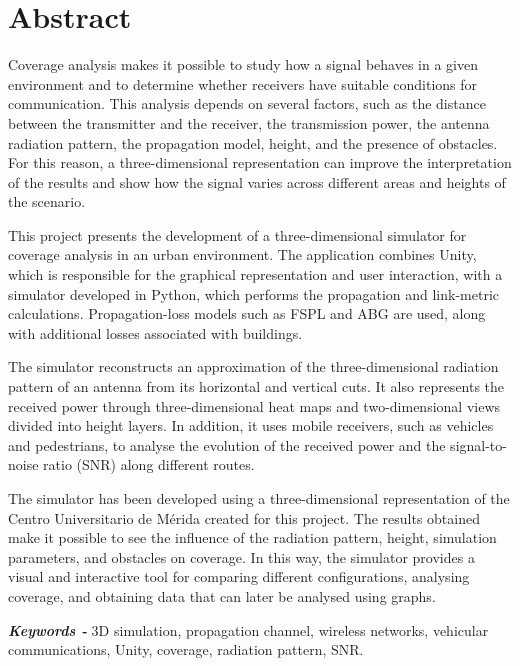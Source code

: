 \renewcommand{\keywords}{{\itshape \bfseries Keywords - }}
\chapter*{Abstract} 

Coverage analysis makes it possible to study how a signal behaves in a given environment and to determine whether receivers have suitable conditions for communication. This analysis depends on several factors, such as the distance between the transmitter and the receiver, the transmission power, the antenna radiation pattern, the propagation model, height, and the presence of obstacles. For this reason, a three-dimensional representation can improve the interpretation of the results and show how the signal varies across different areas and heights of the scenario.

This project presents the development of a three-dimensional simulator for coverage analysis in an urban environment. The application combines Unity, which is responsible for the graphical representation and user interaction, with a simulator developed in Python, which performs the propagation and link-metric calculations. Propagation-loss models such as FSPL and ABG are used, along with additional losses associated with buildings.

The simulator reconstructs an approximation of the three-dimensional radiation pattern of an antenna from its horizontal and vertical cuts. It also represents the received power through three-dimensional heat maps and two-dimensional views divided into height layers. In addition, it uses mobile receivers, such as vehicles and pedestrians, to analyse the evolution of the received power and the signal-to-noise ratio (SNR) along different routes.

The simulator has been developed using a three-dimensional representation of the Centro Universitario de Mérida created for this project. The results obtained make it possible to see the influence of the radiation pattern, height, simulation parameters, and obstacles on coverage. In this way, the simulator provides a visual and interactive tool for comparing different configurations, analysing coverage, and obtaining data that can later be analysed using graphs.



\keywords{3D simulation, propagation channel, wireless networks, vehicular communications, Unity, coverage, radiation pattern, SNR.}